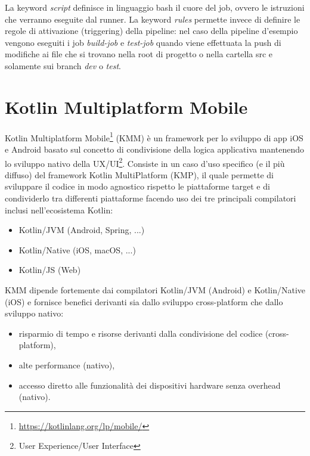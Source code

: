 La keyword \textit{script} definisce in linguaggio bash il cuore del job, ovvero le istruzioni che verranno eseguite dal runner. La keyword \textit{rules} permette invece di definire le regole di attivazione (triggering) della pipeline: nel caso della pipeline d'esempio vengono eseguiti i job \textit{build-job} e \textit{test-job} quando viene effettuata la push di modifiche ai file che si trovano nella root di progetto o nella cartella src e solamente sui branch \textit{dev} o \textit{test}.

\section{Kotlin Multiplatform Mobile}
Kotlin Multiplatform Mobile\footnote{\url{https://kotlinlang.org/lp/mobile/}} (KMM) è un framework per lo sviluppo di app iOS e Android basato sul concetto di condivisione della logica applicativa mantenendo lo sviluppo nativo della UX/UI\footnote{User Experience/User Interface}. Consiste in un caso d'uso specifico (e il più diffuso) del framework Kotlin MultiPlatform (KMP), il quale permette di sviluppare il codice in modo agnostico rispetto le piattaforme target e di condividerlo tra differenti piattaforme facendo uso dei tre principali compilatori inclusi nell'ecosistema Kotlin\cite{nagy2022simplifying}:
\begin{itemize}
    \item Kotlin/JVM (Android, Spring, ...)
    \item Kotlin/Native (iOS, macOS, ...)
    \item Kotlin/JS (Web)
\end{itemize}
KMM dipende fortemente dai compilatori Kotlin/JVM (Android) e Kotlin/Native (iOS) e fornisce benefici derivanti sia dallo sviluppo cross-platform che dallo sviluppo nativo:
\begin{itemize}
    \item risparmio di tempo e risorse derivanti dalla condivisione del codice (cross-platform),
    \item alte performance (nativo),
    \item accesso diretto alle funzionalità dei dispositivi hardware senza overhead (nativo).
\end{itemize}


